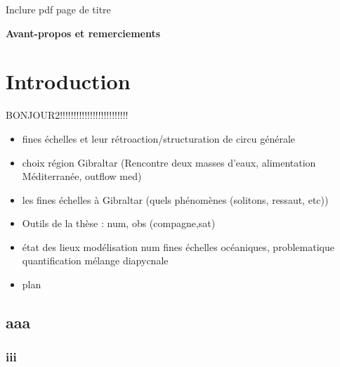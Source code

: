 \documentclass[a4paper,12pt,notitlepage]{report}
\numberwithin{equation}{section}
\begin{document}

\hypersetup{pdfborder=0 0 0}%
\let\noparref\ref
\renewcommand{\ref}[1]{(\noparref{#1})}

\setcounter{tocdepth}{3}%

Inclure pdf page de titre

\newpage
\textbf{Avant-propos et remerciements}
\newpage
\tableofcontents


\newpage
\chapter{Introduction}
\cite{BS84}
BONJOUR2!!!!!!!!!!!!!!!!!!!!!!!!!
\begin{itemize}
\item fines échelles et leur rétroaction/structuration de circu générale
\item choix région Gibraltar (Rencontre deux masses d'eaux, alimentation Méditerranée, outflow med)
\item les fines échelles à Gibraltar (quels phénomènes (solitons, ressaut, etc))
\item Outils de la thèse : num, obs (compagne,sat)
\item état des lieux modélisation num fines échelles océaniques, problematique quantification mélange diapycnale
\item plan
\end{itemize}

\section{aaa}

\subsection{iii}
\end{document}
